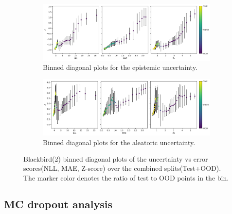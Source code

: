 \begin{figure}[htbp]
  \centering
    \begin{subfigure}[b]{\textwidth}
        \includegraphics[width=\textwidth]{Experiments/figs/binned/bb2_crnn_epistemic.png}
        \caption{Binned diagonal plots for the epistemic uncertainty.}
    \end{subfigure}
    
    \begin{subfigure}[b]{\textwidth}
        \includegraphics[width=\textwidth]{Experiments/figs/binned/bb2_crnn_aleatoric.png}
        \caption{Binned diagonal plots for the aleatoric uncertainty.}
  \end{subfigure}
    \caption[Blackbird(2) error-uncertainty diagonal plots for MC dropout]{Blackbird(2) binned diagonal plots of the  uncertainty vs error scores(NLL, MAE, Z-score) over the combined splits(Test+OOD). The marker color denotes the ratio of test to OOD points in the bin. }
    \label{fig:bb2_uncertainty_corr}
\end{figure}



\subsection{MC dropout analysis}

